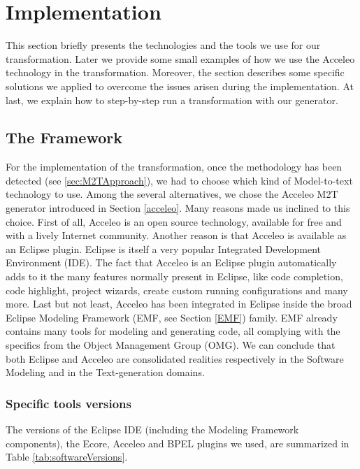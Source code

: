 \section{Implementation} %
\label{sec:TheFramework}
This section briefly presents the technologies and the tools we use for our transformation. Later we provide some small examples of how we use the Acceleo technology in the transformation.
Moreover, the section describes some specific solutions we applied to overcome the issues arisen during the implementation.
At last, we explain how to step-by-step run a transformation with our generator.

\subsection{The Framework}
\label{framework}
For the implementation of the transformation, once the methodology has been detected (see \ref{sec:M2TApproach}), we had to choose which kind of Model-to-text technology to use. Among the several alternatives, we chose the Acceleo M2T generator introduced in Section \ref{acceleo}.
Many reasons made us inclined to this choice. 
First of all, Acceleo is an open source technology, available for free and with a lively Internet community. Another reason is that Acceleo is available as an Eclipse plugin. Eclipse is itself a very popular Integrated Development Environment (IDE). The fact that Acceleo is an Eclipse plugin automatically adds to it the many features normally present in Eclipse, like code completion, code highlight, project wizards, create custom running configurations and many more. 
Last but not least, Acceleo has been integrated in Eclipse inside the broad Eclipse Modeling Framework (EMF, see Section \ref{EMF}) family. EMF already contains many tools for modeling and generating code, all complying with the specifics from the Object Management Group (OMG).
We can conclude that both Eclipse and Acceleo are consolidated realities respectively in the Software Modeling and in the Text-generation domains. 

\subsubsection{Specific tools versions}
\label{sec:specificTools}
The versions of the Eclipse IDE (including the Modeling Framework components), the Ecore, Acceleo and BPEL plugins we used, are summarized in Table \ref{tab:softwareVersions}.

